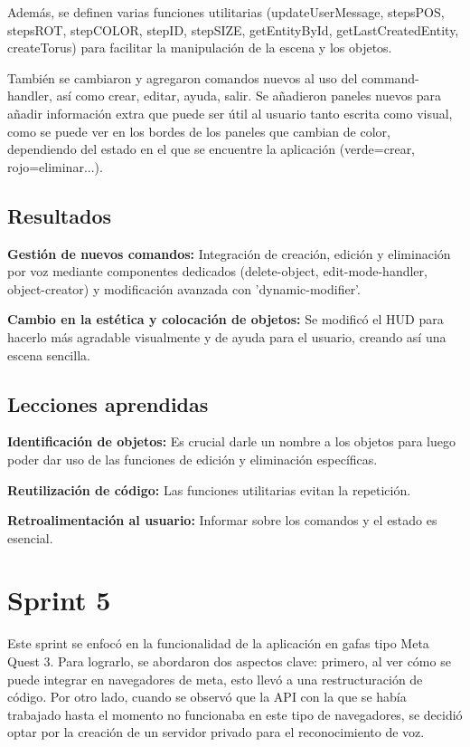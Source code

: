 \documentclass[a4paper, 12pt]{book}
\begin{document}
Además, se definen varias funciones utilitarias (updateUserMessage, stepsPOS, stepsROT, stepCOLOR, stepID, stepSIZE, getEntityById, getLastCreatedEntity, createTorus) para facilitar la manipulación de la escena y los objetos.

También se cambiaron y agregaron comandos nuevos al uso del command-handler, así como crear, editar, ayuda, salir.
Se añadieron paneles nuevos para añadir información extra que puede ser útil al usuario tanto escrita como visual, como se puede ver en los bordes de los paneles que cambian de color, dependiendo del estado en el que se encuentre la aplicación (verde=crear, rojo=eliminar...).
\subsection{Resultados}
\textbf{Gestión de nuevos comandos:} Integración de creación, edición y eliminación por voz mediante componentes dedicados (delete-object, edit-mode-handler, object-creator) y modificación avanzada con 'dynamic-modifier'.

\textbf{Cambio en la estética y colocación de objetos:} Se modificó el HUD para hacerlo más agradable visualmente y de ayuda para el usuario, creando así una escena sencilla.
\subsection{Lecciones aprendidas}

\textbf{Identificación de objetos:} Es crucial darle un nombre a los objetos para luego poder dar uso de las funciones de edición y eliminación específicas.

\textbf{Reutilización de código:} Las funciones utilitarias evitan la repetición.

\textbf{Retroalimentación al usuario:} Informar sobre los comandos y el estado es esencial.


\section{Sprint 5}
\label{sec:sprint5}

Este sprint se enfocó en la funcionalidad de la aplicación en gafas tipo Meta Quest 3. 
Para lograrlo, se abordaron dos aspectos clave:
primero, al ver cómo se puede integrar en navegadores de meta, esto llevó a una restructuración de código.
Por otro lado, cuando se observó que la API con la que se había trabajado hasta el momento no funcionaba en este tipo de navegadores, se decidió optar por la creación de un servidor privado para el reconocimiento de voz.
\end{document}
